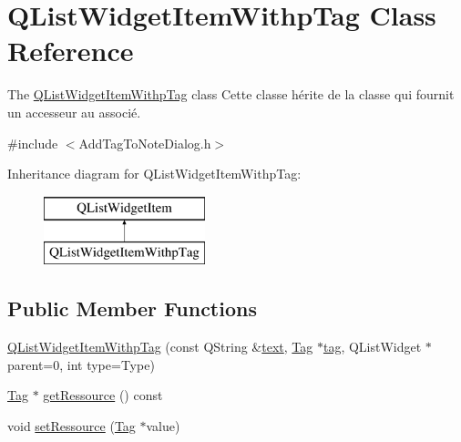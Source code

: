 \hypertarget{class_q_list_widget_item_withp_tag}{\section{Q\-List\-Widget\-Item\-Withp\-Tag Class Reference}
\label{class_q_list_widget_item_withp_tag}
}


The \hyperlink{class_q_list_widget_item_withp_tag}{Q\-List\-Widget\-Item\-Withp\-Tag} class Cette classe hérite de la classe  qui fournit un accesseur au  associé.  




{\ttfamily \#include $<$Add\-Tag\-To\-Note\-Dialog.\-h$>$}

Inheritance diagram for Q\-List\-Widget\-Item\-Withp\-Tag\-:\begin{figure}[H]
\begin{center}
\leavevmode
\includegraphics[height=2.000000cm]{class_q_list_widget_item_withp_tag}
\end{center}
\end{figure}
\subsection*{Public Member Functions}
\begin{DoxyCompactItemize}
\item 
\hyperlink{class_q_list_widget_item_withp_tag_aea58397cdaa1539dcf52d6d562cea053}{Q\-List\-Widget\-Item\-Withp\-Tag} (const Q\-String \&\hyperlink{_export_strategy_8h_a6bd23bde1932319c9832c0129a94b307a0e17259309839615d215adfe7a44fb50}{text}, \hyperlink{class_tag}{Tag} $\ast$\hyperlink{_filter_8h_a7ef0ab496f57e183b484e62e2053c94fa9daab2aa897c0d2d4500bed734b0d780}{tag}, Q\-List\-Widget $\ast$parent=0, int type=Type)
\item 
\hyperlink{class_tag}{Tag} $\ast$ \hyperlink{class_q_list_widget_item_withp_tag_a0845be3784f376f411b99277ea679a91}{get\-Ressource} () const 
\item 
void \hyperlink{class_q_list_widget_item_withp_tag_ac566650aedab94f0d20a9fac47d148e2}{set\-Ressource} (\hyperlink{class_tag}{Tag} $\ast$value)
\end{DoxyCompactItemize}


